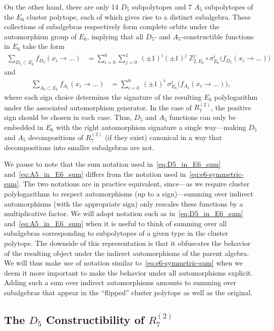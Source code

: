 \documentclass[12pt]{article}
\def\pdfeq#1{\texorpdfstring{$#1$}{a}}
\begin{document}
On the other hand, there are only 14 $D_5$ subpolytopes and 7 $A_5$ subpolytopes of the $E_6$ cluster polytope, each of which gives rise to a distinct subalgebra. These collections of subalgebras respectively form complete orbits under the automorphism group of $E_6$, implying that all $D_5$- and $A_5$-constructible functions in $E_6$ take the form 
\begin{align}
\sum_{D_5\subset E_6} f_{D_5}(x_i \to \ldots) &= \sum_{i=0}^6\sum_{j=0}^1 \ (\pm1)^i (\pm1)^j \ \mathbb{Z}_{2,E_6}^j \circ \sigma_{E_6}^i \Big(f_{D_5}(x_i \to \ldots) \Big) \label{eq:D5_in_E6_sum} 
\end{align}
and
\begin{align}
\sum_{A_5\subset E_6} f_{A_5}(x_i \to \ldots) &= \sum_{i=0}^6 \ (\pm1)^i \ \sigma_{E_6}^i \Big(f_{A_5}(x_i \to \ldots) \Big), \label{eq:A5_in_E6_sum} \end{align}
where each sign choice determines the signature of the resulting $E_6$ polylogarithm under the associated automorphism generator. In the case of $R_7^{(2)}$\!, the positive sign should be chosen in each case. Thus, $D_5$ and $A_5$ functions can only be embedded in $E_6$ with the right automorphism signature a single way---making $D_5$ and $A_5$ decompositions of $R_7^{(2)}$ (if they exist) canonical in a way that decompositions into smaller subalgebras are not. 

We pause to note that the sum notation used in~\eqref{eq:D5_in_E6_sum} and~\eqref{eq:A5_in_E6_sum} differs from the notation used in~\eqref{eq:e6-symmetric-sum}. The two notations are in practice equivalent, since---as we require cluster polylogarithms to respect automorphisms (up to a sign)---summing over indirect automorphisms (with the appropriate sign) only rescales these functions by a multiplicative factor. We will adopt notation such as in~\eqref{eq:D5_in_E6_sum} and~\eqref{eq:A5_in_E6_sum} when it is useful to think of summing over all subalgebras corresponding to subpolytopes of a given type in the cluster polytope. The downside of this representation is that it obfuscates the behavior of the resulting object under the indirect automorphisms of the parent algebra. We will thus make use of notation similar to~\eqref{eq:e6-symmetric-sum} when we deem it more important to make the behavior under all automorphisms explicit. Adding such a sum over indirect automorphisms amounts to summing over subalgebras that appear in the ``flipped'' cluster polytope as well as the original.

\subsection{The \pdfeq{D_5} Constructibility of \pdfeq{R^{(2)}_7}}\label{sec:d5-func}
\end{document}
